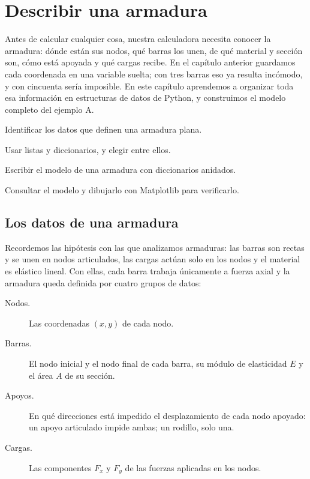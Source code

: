 \chapter{Describir una armadura}\label{cap:describir_armadura}

Antes de calcular cualquier cosa, nuestra calculadora necesita conocer la
armadura: dónde están sus nodos, qué barras los unen, de qué material y
sección son, cómo está apoyada y qué cargas recibe. En el capítulo anterior
guardamos cada coordenada en una variable suelta; con tres barras eso ya
resulta incómodo, y con cincuenta sería imposible. En este capítulo aprendemos
a organizar toda esa información en estructuras de datos de Python, y
construimos el modelo completo del ejemplo A.

\begin{objetivos}
  \item Identificar los datos que definen una armadura plana.
  \item Usar listas y diccionarios, y elegir entre ellos.
  \item Escribir el modelo de una armadura con diccionarios anidados.
  \item Consultar el modelo y dibujarlo con Matplotlib para verificarlo.
\end{objetivos}

\section{Los datos de una armadura}\label{sec:datos_armadura}

Recordemos las hipótesis con las que analizamos armaduras: las barras son
rectas y se unen en nodos articulados, las cargas actúan solo en los nodos y
el material es elástico lineal. Con ellas, cada barra trabaja únicamente a
fuerza axial y la armadura queda definida por cuatro grupos de datos:

\begin{description}
  \item[Nodos.] Las coordenadas $(x, y)$ de cada nodo.
  \item[Barras.] El nodo inicial y el nodo final de cada barra, su módulo de
    elasticidad $E$ y el área $A$ de su sección.
  \item[Apoyos.] En qué direcciones está impedido el desplazamiento de cada
    nodo apoyado: un apoyo articulado impide ambas; un rodillo, solo una.
  \item[Cargas.] Las componentes $F_x$ y $F_y$ de las fuerzas aplicadas en los
    nodos.
\end{description}

